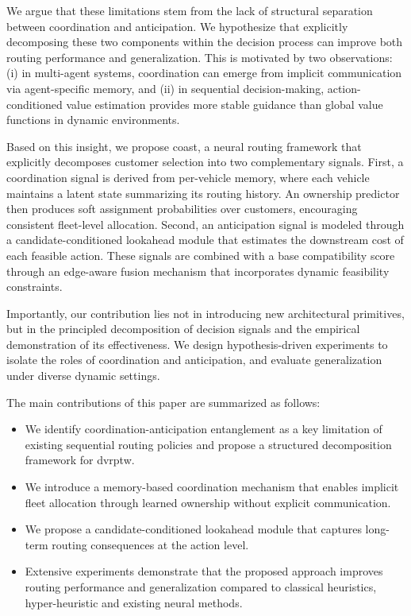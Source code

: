 \documentclass[conference]{IEEEtran}
\begin{document}
We argue that these limitations stem from the lack of structural separation between coordination and anticipation. We hypothesize that explicitly decomposing these two components within the decision process can improve both routing performance and generalization. This is motivated by two observations: (i) in multi-agent systems, coordination can emerge from implicit communication via agent-specific memory, and (ii) in sequential decision-making, action-conditioned value estimation provides more stable guidance than global value functions in dynamic environments.

Based on this insight, we propose \gls{coast}, a neural routing framework that explicitly decomposes customer selection into two complementary signals. First, a coordination signal is derived from per-vehicle memory, where each vehicle maintains a latent state summarizing its routing history. An ownership predictor then produces soft assignment probabilities over customers, encouraging consistent fleet-level allocation. Second, an anticipation signal is modeled through a candidate-conditioned lookahead module that estimates the downstream cost of each feasible action. These signals are combined with a base compatibility score through an edge-aware fusion mechanism that incorporates dynamic feasibility constraints.

Importantly, our contribution lies not in introducing new architectural primitives, but in the principled decomposition of decision signals and the empirical demonstration of its effectiveness. We design hypothesis-driven experiments to isolate the roles of coordination and anticipation, and evaluate generalization under diverse dynamic settings.


The main contributions of this paper are summarized as follows:
\begin{itemize}
    \item We identify coordination-anticipation entanglement as a key limitation of existing sequential routing policies and propose a structured decomposition framework for \gls{dvrptw}.
    \item We introduce a memory-based coordination mechanism that enables implicit fleet allocation through learned ownership without explicit communication.
    \item We propose a candidate-conditioned lookahead module that captures long-term routing consequences at the action level.
    \item Extensive experiments demonstrate that the proposed approach improves routing performance and generalization compared to classical heuristics, hyper-heuristic and existing neural methods.
\end{itemize}
\end{document}
